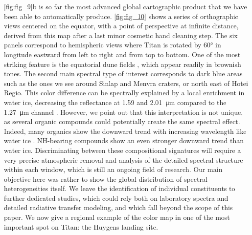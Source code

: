 \documentclass[preprint,twocolumn,5p,authoryear,compress,colorlinks=true]{elsarticle}
\newcommand{\figref}[1]{\autoref{fig:#1}}
\begin{document}
{\figref{fig_9}b is so far the most advanced global cartographic product that we have been able to automatically produce. \figref{fig_10} shows a series of orthographic views centered on the equator, with a point of perspective at infinite distance, derived from this map after a last minor cosmetic hand cleaning step. The six panels correspond to hemispheric views where Titan is rotated by \ang{60} in longitude eastward from left to right and from top to bottom. One of the most striking feature is the equatorial dune fields \citep{Radebaugh2008, Rodriguez2014}, which appear readily in brownish tones. The second main spectral type of interest corresponds to dark blue areas such as the ones we see around Sinlap and Menvra craters, or north east of Hotei Regio. This color difference can be spectrally explained by a local enrichment in water ice, decreasing the reflectance at 1.59 and \SI{2.01}{\um} compared to the \SI{1.27}{\um} channel \citep{Rodriguez2006, McCord2008, Brossier2018, Solomonidou2018}.
However, we point out that this interpretation is not unique, as several organic compounds could potentially create the same spectral effect. Indeed, many organics show the downward trend with increasing wavelength like water ice \citep[\emph{e.g.,}][]{Clark2009, Clark2010, Kokaly2017}. NH-bearing compounds show an even stronger downward trend than water ice. Discriminating between these compositional signatures will require a very precise atmospheric removal and analysis of the detailed spectral structure within each window, which is still an ongoing field of research. Our main objective here was rather to show the global distribution of spectral heterogeneities itself. We leave the identification of individual constituents to further dedicated studies, which could rely both on laboratory spectra and detailed radiative transfer modeling, and which fall beyond the scope of this paper. We now give a regional example of the color map in one of the most important spot on Titan: the Huygens landing site.

}
\end{document}
